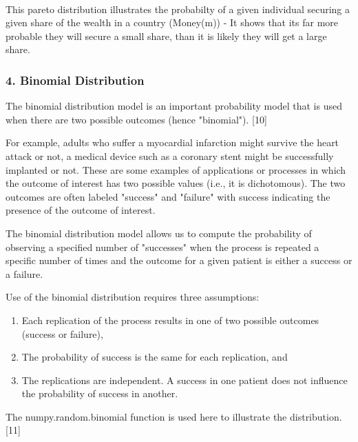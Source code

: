 \documentclass[11pt]{article}
\providecommand{\tightlist}{%
      \setlength{\itemsep}{0pt}\setlength{\parskip}{0pt}}
\begin{document}
    \begin{center}
    \end{center}
    { \hspace*{\fill} \\}
    
    This pareto distribution illustrates the probabilty of a given
individual securing a given share of the wealth in a country (Money(m))
- It shows that its far more probable they will secure a small share,
than it is likely they will get a large share.

    \subsubsection{4. Binomial Distribution}\label{binomial-distribution}

    The binomial distribution model is an important probability model that
is used when there are two possible outcomes (hence "binomial").
{[}10{]}

For example, adults who suffer a myocardial infarction might survive the
heart attack or not, a medical device such as a coronary stent might be
successfully implanted or not. These are some examples of applications
or processes in which the outcome of interest has two possible values
(i.e., it is dichotomous). The two outcomes are often labeled "success"
and "failure" with success indicating the presence of the outcome of
interest.

The binomial distribution model allows us to compute the probability of
observing a specified number of "successes" when the process is repeated
a specific number of times and the outcome for a given patient is either
a success or a failure.

Use of the binomial distribution requires three assumptions:

\begin{enumerate}
\def\labelenumi{\arabic{enumi}.}
\tightlist
\item
  Each replication of the process results in one of two possible
  outcomes (success or failure),
\item
  The probability of success is the same for each replication, and
\item
  The replications are independent. A success in one patient does not
  influence the probability of success in another.
\end{enumerate}

The numpy.random.binomial function is used here to illustrate the
distribution. {[}11{]}
\end{document}
